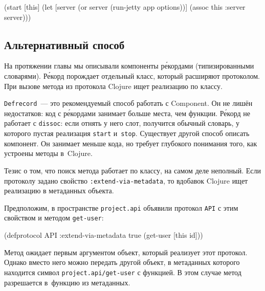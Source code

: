 \else

\begin{english}
  \begin{clojure}
(start [this]
  (let [server (or server
                   (run-jetty app options))]
    (assoc this :server server)))
  \end{clojure}
\end{english}

\fi

\subsection{Альтернативный способ}

На протяжении главы мы описывали компоненты р\'{е}кордами (типизированными
словарями). Р\'{е}корд порождает отдельный класс, который расширяют
протоколом. При вызове метода из протокола Clojure ищет реализацию по классу.


\verb|Defrecord|~--- это рекомендуемый способ работать с Component. Он не лишён
недостатков: код с р\'{е}кордами занимает больше места, чем функции. Р\'{е}корд
не работает с \verb|dissoc|: если отнять у него слот, получится обычный словарь,
у которого пустая реализация \verb|start| и~\verb|stop|. Существует другой
способ описать компонент. Он занимает меньше кода, но требует глубокого
понимания того, как устроены методы в~Clojure.

Тезис о том, что поиск метода работает по классу, на самом деле неполный. Если
протоколу задано свойство \verb|:extend-via-metadata|, то вдобавок Clojure ищет
реализацию в метаданных объекта.

Предположим, в пространстве \verb|project.api| объявили протокол \verb|API| с
этим свойством и методом \verb|get-user|:

\begin{english}
  \begin{clojure}
(defprotocol API
  :extend-via-metadata true
  (get-user [this id]))
  \end{clojure}
\end{english}

Метод ожидает первым аргументом объект, который реализует этот протокол. Однако
вместо него можно передать другой объект, в метаданных которого находится символ
\verb|project.api/get-user| с функцией. В этом случае метод разрешается
в~функцию из метаданных.

\begin{english}
\end{english}

